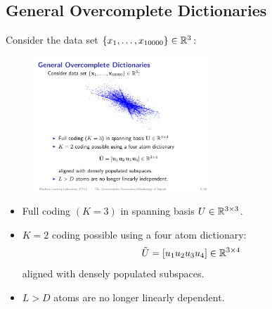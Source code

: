\subsection{General Overcomplete Dictionaries}
Consider the data set $\{x_1,\ldots, x_{10000}\}\in \mathbb{R}^3$:
\begin{figure}[H]
    \centering
    \includegraphics[width=0.6\textwidth]{img/09_overcomplete}
\end{figure}
\begin{itemize}
\item Full coding $(K=3)$ in spanning basis $U\in \mathbb{R}^{3\times 3}$.
\item $K=2$ coding possible using a four atom dictionary:
    \begin{align*}
         \tilde U = [u_1 u_2 u_3 u_4]\in \mathbb{R}^{3\times 4}
    \end{align*}
    aligned with densely populated subspaces.
\item $L>D$ atoms are no longer linearly dependent.
\end{itemize}


